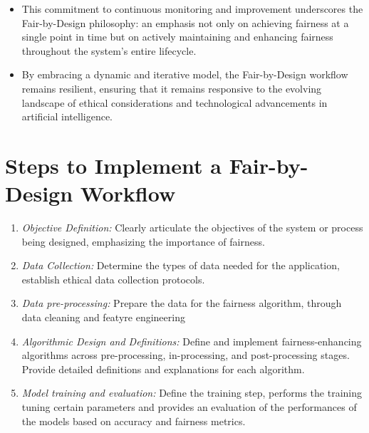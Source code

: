 \begin{enumerate}[label=\arabic*.]
\begin{itemize}
        \item This commitment to continuous monitoring and improvement underscores the Fair-by-Design philosophy: an emphasis not only on achieving fairness at a single point in time but on actively maintaining and enhancing fairness throughout the system's entire lifecycle.
      
        \item By embracing a dynamic and iterative model, the Fair-by-Design workflow remains resilient, ensuring that it remains responsive to the evolving landscape of ethical considerations and technological advancements in artificial intelligence.
   
    \end{itemize}

\end{enumerate}

\section{Steps to Implement a Fair-by-Design Workflow}
\label{section:steps}

\begin{enumerate}

    \item \emph{Objective Definition:} Clearly articulate the objectives of the system or process being designed, emphasizing the importance of fairness.

    \item \emph{Data Collection:} Determine the types of data needed for the application, establish ethical data collection protocols.

    \item \emph{Data pre-processing:} Prepare the data for the fairness algorithm, through data cleaning and featyre engineering
    
    \item \emph{Algorithmic Design and Definitions:} Define and implement fairness-enhancing algorithms across pre-processing, in-processing, and post-processing stages. Provide detailed definitions and explanations for each algorithm.

    \item \emph{Model training and evaluation:} Define the training step, performs the training tuning certain parameters and provides an evaluation of the performances of the models based on accuracy and fairness metrics.

\end{enumerate}


